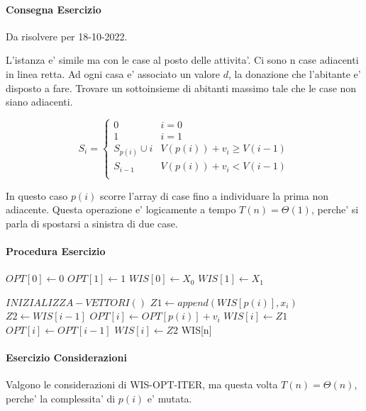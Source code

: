 \paragraph{Consegna Esercizio}
Da risolvere per 18-10-2022.

L'istanza e' simile ma con le case al posto delle attivita'.
Ci sono n case adiacenti in linea retta.
Ad ogni casa e' associato un valore $d$, la donazione che l'abitante e' disposto a fare.
Trovare un sottoinsieme di abitanti massimo tale che le case non siano adiacenti.

\[
    S_i =
    \begin{cases}
        \text{$0$} & \text{$i = 0$} \\
        \text{$1$} & \text{$i = 1$} \\
        \text{$S_{p(i)} \cup {i}$} & \text{$V(p(i)) + v_i \geq V(i-1)$} \\
        \text{$S_{i-1}$} & \text{$V(p(i)) + v_i < V(i-1)$} \\
    \end{cases}
\]

In questo caso $p(i)$ scorre l'array di case fino a individuare la prima non adiacente.
Questa operazione e' logicamente a tempo $T(n) = \Theta(1)$, perche' si parla di spostarsi a sinistra di due case.

\pagebreak

\paragraph{Procedura Esercizio}

\begin{algorithm}
    \begin{algorithmic}
            \State $OPT[0] \gets 0$
            \State $OPT[1] \gets 1$
            \State $WIS[0] \gets X_0$
            \State $WIS[1] \gets X_1$
        \EndProcedure
    \end{algorithmic}
\end{algorithm}

\begin{algorithm}
    \begin{algorithmic}
            \State $INIZIALIZZA-VETTORI()$
                \State $Z1 \gets append(WIS[p(i)], x_i)$
                \State $Z2 \gets WIS[i-1]$
                    \State $OPT[i] \gets OPT[p(i)] + v_i$
                    \State $WIS[i] \gets Z1$
                \Else
                    \State $OPT[i] \gets OPT[i-1]$
                    \State $WIS[i] \gets Z2$
                \EndIf
            \EndFor
            \State \Return WIS[n]
        \EndProcedure
    \end{algorithmic}
\end{algorithm}

\pagebreak

\paragraph{Esercizio Considerazioni}

Valgono le considerazioni di WIS-OPT-ITER, ma questa volta $T(n) = \Theta(n)$, perche' la complessita' di $p(i)$ e' mutata.
